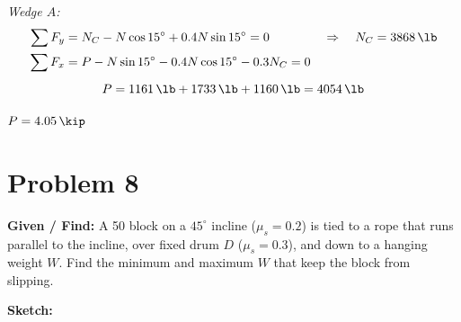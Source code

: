 \documentclass[11pt]{article}
\newcommand{\problem}[1]{\clearpage\section*{Problem #1}}
\begin{document}
\textit{Wedge $A$:}
\begin{align*}
    \sum F_y &= N_C - N\cos 15^\circ + 0.4N\sin 15^\circ = 0 &&\Rightarrow\quad N_C = \SI{3868}{\lb} \\
    \sum F_x &= P - N\sin 15^\circ - 0.4N\cos 15^\circ - 0.3N_C = 0
\end{align*}
\[
    P = \SI{1161}{\lb} + \SI{1733}{\lb} + \SI{1160}{\lb} = \SI{4054}{\lb}
\]

\begin{finalanswer}
    $P = \SI{4.05}{\kip}$
\end{finalanswer}

\problem{8}

\textbf{Given / Find:} A \SI{50}{\lb} block on a $45^\circ$ incline ($\mu_s = 0.2$) is tied to a rope that runs parallel to the incline, over fixed drum $D$ ($\mu_s = 0.3$), and down to a hanging weight $W$. Find the minimum and maximum $W$ that keep the block from slipping.

\textbf{Sketch:}
\end{document}
